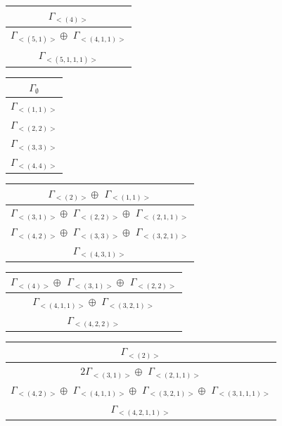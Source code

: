 \begin{minipage}{.4\textwidth}
\centering
\begin{tabular}{|c|}\hline
$\Gamma_{<(
4
)>}$
\\ \hline
$\Gamma_{<(
5 , 
1
)>} \oplus$
$\Gamma_{<(
4 , 
1 , 
1
)>}$
\\ \hline
$\Gamma_{<(
5 , 
1 , 
1 , 
1
)>}$
\\
\hline\end{tabular}\end{minipage}
\begin{minipage}{.2\textwidth}
\centering
\begin{tabular}{|c|}\hline
$\Gamma_\emptyset$
\\ \hline
$\Gamma_{<(
1 , 
1
)>}$
\\ \hline
$\Gamma_{<(
2 , 
2
)>}$
\\ \hline
$\Gamma_{<(
3 , 
3
)>}$
\\ \hline
$\Gamma_{<(
4 , 
4
)>}$
\\
\hline\end{tabular}\end{minipage}
\bigskip
\begin{minipage}{.5\textwidth}
\centering
\begin{tabular}{|c|}\hline
$\Gamma_{<(
2
)>} \oplus$
$\Gamma_{<(
1 , 
1
)>}$
\\ \hline
$\Gamma_{<(
3 , 
1
)>} \oplus$
$\Gamma_{<(
2 , 
2
)>} \oplus$
$\Gamma_{<(
2 , 
1 , 
1
)>}$
\\ \hline
$\Gamma_{<(
4 , 
2
)>} \oplus$
$\Gamma_{<(
3 , 
3
)>} \oplus$
$\Gamma_{<(
3 , 
2 , 
1
)>}$
\\ \hline
$\Gamma_{<(
4 , 
3 , 
1
)>}$
\\
\hline\end{tabular}\end{minipage}
\begin{minipage}{.5\textwidth}
\centering
\begin{tabular}{|c|}\hline
$\Gamma_{<(
4
)>} \oplus$
$\Gamma_{<(
3 , 
1
)>} \oplus$
$\Gamma_{<(
2 , 
2
)>}$
\\ \hline
$\Gamma_{<(
4 , 
1 , 
1
)>} \oplus$
$\Gamma_{<(
3 , 
2 , 
1
)>}$
\\ \hline
$\Gamma_{<(
4 , 
2 , 
2
)>}$
\\
\hline\end{tabular}\end{minipage}
\bigskip
\begin{minipage}{.5\textwidth}
\centering
\begin{tabular}{|c|}\hline
$\Gamma_{<(
2
)>}$
\\ \hline
$ 2 \Gamma_{<(
3 , 
1
)>} \oplus$
$\Gamma_{<(
2 , 
1 , 
1
)>}$
\\ \hline
$\Gamma_{<(
4 , 
2
)>} \oplus$
$\Gamma_{<(
4 , 
1 , 
1
)>} \oplus$
$\Gamma_{<(
3 , 
2 , 
1
)>} \oplus$
$\Gamma_{<(
3 , 
1 , 
1 , 
1
)>}$
\\ \hline
$\Gamma_{<(
4 , 
2 , 
1 , 
1
)>}$
\\
\hline\end{tabular}\end{minipage}
